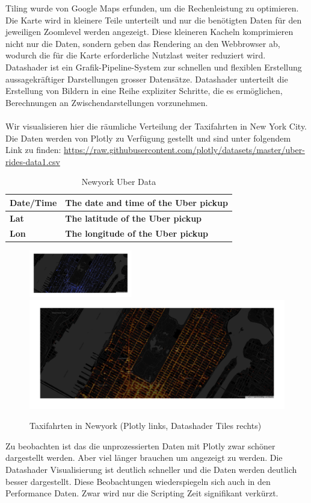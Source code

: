 \documentclass{article}
\begin{document}
Tiling wurde von Google Maps erfunden, um die Rechenleistung zu optimieren. Die Karte wird in kleinere Teile unterteilt und nur die benötigten Daten für den jeweiligen Zoomlevel werden angezeigt.
Diese kleineren Kacheln komprimieren nicht nur die Daten, sondern geben das Rendering an den Webbrowser ab, wodurch die für die Karte erforderliche Nutzlast weiter reduziert wird.\cite{noauthor_map_nodate}
Datashader ist ein Grafik-Pipeline-System zur schnellen und flexiblen Erstellung aussagekräftiger Darstellungen grosser Datensätze. Datashader unterteilt die Erstellung von Bildern in eine Reihe expliziter Schritte, die es ermöglichen, Berechnungen an Zwischendarstellungen vorzunehmen.\cite{wong_abstract_2013}
\\
\\
Wir visualisieren hier die räumliche Verteilung der Taxifahrten in New York City. 
Die Daten werden von Plotly zu Verfügung gestellt und sind unter folgendem Link zu finden: \url{https://raw.githubusercontent.com/plotly/datasets/master/uber-rides-data1.csv}

\begin{table}[!h]
\centering
\begin{tabular}{|l|l|}
\hline
\textbf{Date/Time} & \textbf{The date and time of the Uber pickup} \\
\hline
\textbf{Lat} & \textbf{The latitude of the Uber pickup} \\
\hline
\textbf{Lon} & \textbf{The longitude of the Uber pickup} \\
\hline
\end{tabular}
\caption{\label{tab: LE1 Newyork Taxi Data} Newyork Uber Data}
\end{table}



\begin{figure}[!h]
\centering
\includegraphics[width=0.4\textwidth]{img/newyork_plotly.png}
\includegraphics[height=0.18\textwidth]{img/newyork_datashader.png}
\caption{\label{fig: LE1 Plotly vs Datashader} Taxifahrten in Newyork (Plotly links, Datashader Tiles rechts)}
\end{figure}
\noindent
Zu beobachten ist das die unprozessierten Daten mit Plotly zwar schöner dargestellt werden. Aber viel länger brauchen um angezeigt zu werden. Die Datashader Visualisierung ist deutlich schneller und die Daten werden deutlich besser dargestellt.
Diese Beobachtungen wiederspiegeln sich auch in den Performance Daten. Zwar wird nur die Scripting Zeit signifikant verkürzt.
\end{document}
